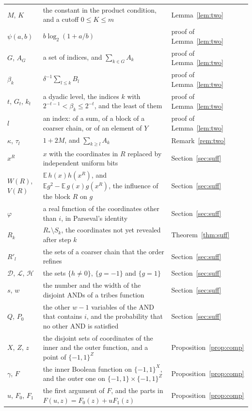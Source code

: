 \documentclass[11pt]{amsart}
\theoremstyle{remark}
\newcommand{\E}{\mathbb{E}}
\begin{document}
\begin{longtable}{@{}>{\raggedright\arraybackslash}p{}>{\raggedright\arraybackslash}p{}>{\raggedright\arraybackslash}p{}@{}}
$M$, $K$ & the constant in the product condition, and a cutoff $0\le K\le m$ & Lemma~\ref{lem:two} \\
$\psi(a,b)$ & $b\log_2(1+a/b)$ & proof of Lemma~\ref{lem:two} \\
$G$, $A_G$ & a set of indices, and $\sum_{k\in G}A_k$ & proof of Lemma~\ref{lem:two} \\
$\beta_k$ & $\delta^{-1}\sum_{l\le k}B_l$ & proof of Lemma~\ref{lem:two} \\
$t$, $G_t$, $k_t$ & a dyadic level, the indices $k$ with $2^{-t-1}<\beta_k\le2^{-t}$, and the least of them & proof of Lemma~\ref{lem:two} \\
$l$ & an index: of a sum, of a block of a coarser chain, or of an element of $Y$ & proof of Lemma~\ref{lem:two} \\
$\kappa$, $\tau_l$ & $1+2M$, and $\sum_{k\ge l}A_k$ & Remark~\ref{rem:two} \\
$x^R$ & $x$ with the coordinates in $R$ replaced by independent uniform bits & Section~\ref{sec:suff} \\
$W(R)$, $V(R)$ & $\E\,h(x)h(x^R)$, and $\E g^2-\E\,g(x)g(x^R)$, the influence of the block $R$ on $g$ & Section~\ref{sec:suff} \\
$\varphi$ & a real function of the coordinates other than $i$, in Parseval's identity & Section~\ref{sec:suff} \\
$R_k$ & $R_*\setminus S_k$, the coordinates not yet revealed after step $k$ & Theorem~\ref{thm:suff} \\
$R'_l$ & the sets of a coarser chain that the order refines & Section~\ref{sec:suff} \\
$\mathcal D$, $\mathcal L$, $\mathcal H$ & the sets $\{h\ne0\}$, $\{g=-1\}$ and $\{g=1\}$ & Section~\ref{sec:suff} \\
$s$, $w$ & the number and the width of the disjoint ANDs of a tribes function & Section~\ref{sec:suff} \\
$Q$, $P_0$ & the other $w-1$ variables of the AND that contains $i$, and the probability that no other AND is satisfied & Section~\ref{sec:suff} \\
$X$, $Z$, $z$ & the disjoint sets of coordinates of the inner and the outer function, and a point of $\{-1,1\}^Z$ & Proposition~\ref{prop:comp} \\
$\gamma$, $F$ & the inner Boolean function on $\{-1,1\}^X$, and the outer one on $\{-1,1\}\times\{-1,1\}^Z$ & Proposition~\ref{prop:comp} \\
$u$, $F_0$, $F_1$ & the first argument of $F$, and the parts in $F(u,z)=F_0(z)+uF_1(z)$ & Proposition~\ref{prop:comp} \\

\end{longtable}
\end{document}
